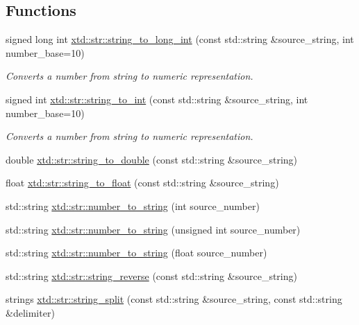 \subsection*{Functions}
\begin{DoxyCompactItemize}
\item 
signed long int \hyperlink{namespacextd_1_1str_a0dce7c929afcd50ffbdb542a5aeaf37a}{xtd\-::str\-::string\-\_\-to\-\_\-long\-\_\-int} (const std\-::string \&source\-\_\-string, int number\-\_\-base=10)
\begin{DoxyCompactList}\small\item\em Converts a number from string to numeric representation. \end{DoxyCompactList}\item 
signed int \hyperlink{namespacextd_1_1str_a4c8c7aa55d1f5637474424b9abab6467}{xtd\-::str\-::string\-\_\-to\-\_\-int} (const std\-::string \&source\-\_\-string, int number\-\_\-base=10)
\begin{DoxyCompactList}\small\item\em Converts a number from string to numeric representation. \end{DoxyCompactList}\item 
double \hyperlink{namespacextd_1_1str_aaabc2e3834d3052e392cda6140ae5cc2}{xtd\-::str\-::string\-\_\-to\-\_\-double} (const std\-::string \&source\-\_\-string)
\item 
float \hyperlink{namespacextd_1_1str_a90f49ec1f4ff29fd05d598f815f9b4e0}{xtd\-::str\-::string\-\_\-to\-\_\-float} (const std\-::string \&source\-\_\-string)
\item 
std\-::string \hyperlink{namespacextd_1_1str_a84c0f8285134f075fde7fbb91ee174ef}{xtd\-::str\-::number\-\_\-to\-\_\-string} (int source\-\_\-number)
\item 
std\-::string \hyperlink{namespacextd_1_1str_a485b63dcd6cac4d8b45712f634a2aaed}{xtd\-::str\-::number\-\_\-to\-\_\-string} (unsigned int source\-\_\-number)
\item 
std\-::string \hyperlink{namespacextd_1_1str_ae520ea89838af34abca58612baf0ee7d}{xtd\-::str\-::number\-\_\-to\-\_\-string} (float source\-\_\-number)
\item 
std\-::string \hyperlink{namespacextd_1_1str_a0e5d3ce0842d8c4a0b42ec6bba6c5b00}{xtd\-::str\-::string\-\_\-reverse} (const std\-::string \&source\-\_\-string)
\item 
strings \hyperlink{namespacextd_1_1str_a94ab05421170b46d98baffd7fbd04ae5}{xtd\-::str\-::string\-\_\-split} (const std\-::string \&source\-\_\-string, const std\-::string \&delimiter)

\end{DoxyCompactItemize}
